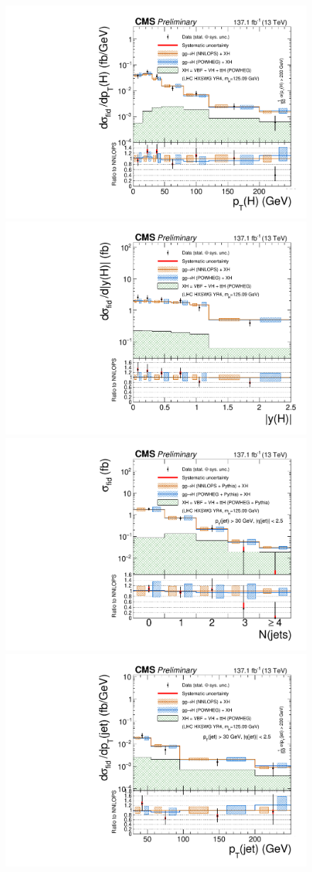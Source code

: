 \begin{figure}[!htb]
        \centering
        \includegraphics[width=0.45\linewidth]{Figures/results/fiducial/comb/pT4l_unfoldwith_SM_125_logscale.pdf}
        \includegraphics[width=0.45\linewidth]{Figures/results/fiducial/comb/rapidity4l_unfoldwith_SM_125_logscale.pdf} \\
        \includegraphics[width=0.45\linewidth]{Figures/results/fiducial/comb/njets_pt30_eta2p5_unfoldwith_SM_125_logscale.pdf}
        \includegraphics[width=0.45\linewidth]{Figures/results/fiducial/comb/pt_leadingjet_pt30_eta2p5_unfoldwith_SM_125_logscale.pdf}
        \caption{
}
\end{figure}
